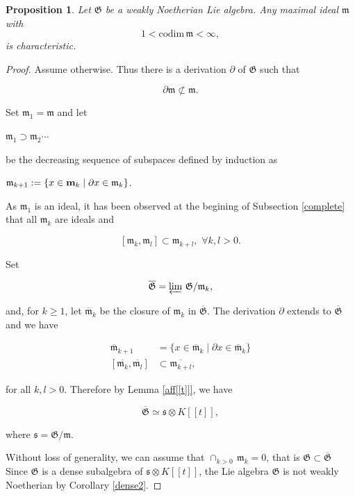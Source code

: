 \documentclass[11pt, letterpaper, reqno]{amsart}
\newtheorem{prop}[theorem]{Proposition}
\theoremstyle{definition}
\newcommand{\G}{\mathfrak G}
\newcommand{\fm}{\mathfrak{m}}
\newcommand{\fs}{\mathfrak{s}}
\newcommand{\fG}{\mathfrak{G}}
\newcommand{\codim}{\mathrm{codim}}
\begin{document}
\begin{prop}\label{propfinitecodim} Let $\fG$ be a weakly Noetherian
Lie algebra. Any  maximal ideal $\fm$
with
$$1<\codim\, \fm<\infty,$$
\noindent is characteristic.
\end{prop}

\begin{proof}
Assume otherwise. Thus there is a derivation 
$\partial$ of $\fG$ such that 

$$\partial \fm\not\subset\fm.$$

Set $\fm_1=\fm$  and let

\centerline{${\fm}_1\supset {\fm}_2\cdots$}

\noindent  be the decreasing 
sequence of subspaces defined by induction as

\centerline{
${\fm}_{k+1}:=\{x\in {\bf m}_k\mid \partial x\in{\fm}_k\}$.}

\noindent As ${\fm_1}$ is an ideal, it has been observed 
at the begining of  Subsection \ref{complete} that all ${\fm}_{k}$ are ideals and

$$[\fm_k,\fm_l]\subset \fm_{k+l},\,\,\forall k,l>0.$$


Set

$$\overline{\fG}=\varprojlim\,\fG/\fm_k,$$

\noindent and, for $k\geq 1$,  let $\overline{\fm}_k$ be the closure of $\fm_k$ in $\overline{\fG}$. The derivation $\partial$ extends to $\overline{\fG}$ and we have


\begin{align*}
\overline{\fm}_{k+1}&=\{x\in 
\overline{\fm}_k\mid 
\partial x\in\overline{\fm}_k\}\\
[\overline{\fm_k},\overline{\fm_l}]&\subset 
\overline{\fm_{k+l}},
\end{align*}

\noindent for all $k, l>0$.
Therefore by Lemma \ref{aff[[t]]},
we have

$$\overline{\fG}\simeq \fs\otimes K[[t]],$$

\noindent where $\fs=\fG/\fm$.

Without loss of generality, we can assume that
$\cap_{k>0}\,\fm_k=0$, that is $\fG\subset \overline{\G}$ Since $\fG$ is a dense 
 subalgebra of $\fs\otimes K[[t]]$, the Lie algebra $\fG$ is not weakly Noetherian by  Corollary \ref{dense2}.
\end{proof}
\end{document}
